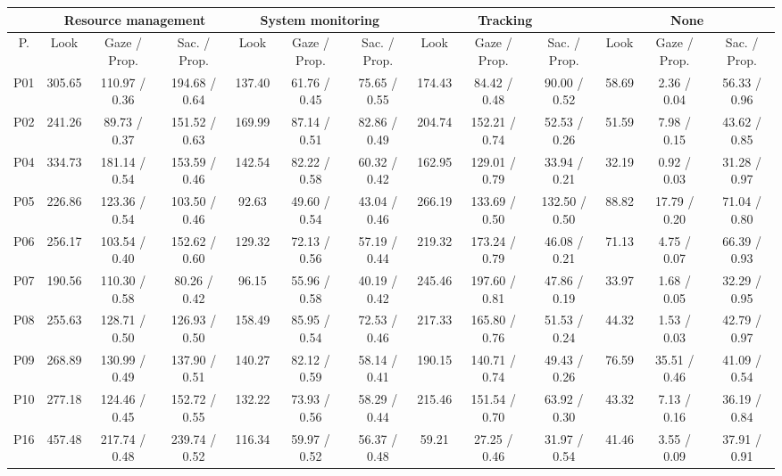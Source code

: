 \begin{tabular}{|c|c|c|c|c|c|c|c|c|c|c|c|c|}
\hline
 & \multicolumn{3}{|c}{Resource management} & \multicolumn{3}{|c}{System monitoring} & \multicolumn{3}{|c}{Tracking} & \multicolumn{3}{|c}{None} \\ \hline 
P. & Look & Gaze / Prop. & Sac. / Prop. & Look & Gaze / Prop. & Sac. / Prop. & Look & Gaze / Prop. & Sac. / Prop. & Look & Gaze  / Prop. & Sac. / Prop.\\ \hline 
 P01& 305.65 & 110.97 /   0.36 & 194.68 /   0.64& 137.40 &  61.76 /   0.45 &  75.65 /   0.55& 174.43 &  84.42 /   0.48 &  90.00 /   0.52&  58.69 &   2.36 /   0.04 &  56.33 /   0.96\\ \hline 
P02& 241.26 &  89.73 /   0.37 & 151.52 /   0.63& 169.99 &  87.14 /   0.51 &  82.86 /   0.49& 204.74 & 152.21 /   0.74 &  52.53 /   0.26&  51.59 &   7.98 /   0.15 &  43.62 /   0.85\\ \hline 
P04& 334.73 & 181.14 /   0.54 & 153.59 /   0.46& 142.54 &  82.22 /   0.58 &  60.32 /   0.42& 162.95 & 129.01 /   0.79 &  33.94 /   0.21&  32.19 &   0.92 /   0.03 &  31.28 /   0.97\\ \hline 
P05& 226.86 & 123.36 /   0.54 & 103.50 /   0.46&  92.63 &  49.60 /   0.54 &  43.04 /   0.46& 266.19 & 133.69 /   0.50 & 132.50 /   0.50&  88.82 &  17.79 /   0.20 &  71.04 /   0.80\\ \hline 
P06& 256.17 & 103.54 /   0.40 & 152.62 /   0.60& 129.32 &  72.13 /   0.56 &  57.19 /   0.44& 219.32 & 173.24 /   0.79 &  46.08 /   0.21&  71.13 &   4.75 /   0.07 &  66.39 /   0.93\\ \hline 
P07& 190.56 & 110.30 /   0.58 &  80.26 /   0.42&  96.15 &  55.96 /   0.58 &  40.19 /   0.42& 245.46 & 197.60 /   0.81 &  47.86 /   0.19&  33.97 &   1.68 /   0.05 &  32.29 /   0.95\\ \hline 
P08& 255.63 & 128.71 /   0.50 & 126.93 /   0.50& 158.49 &  85.95 /   0.54 &  72.53 /   0.46& 217.33 & 165.80 /   0.76 &  51.53 /   0.24&  44.32 &   1.53 /   0.03 &  42.79 /   0.97\\ \hline 
P09& 268.89 & 130.99 /   0.49 & 137.90 /   0.51& 140.27 &  82.12 /   0.59 &  58.14 /   0.41& 190.15 & 140.71 /   0.74 &  49.43 /   0.26&  76.59 &  35.51 /   0.46 &  41.09 /   0.54\\ \hline 
P10& 277.18 & 124.46 /   0.45 & 152.72 /   0.55& 132.22 &  73.93 /   0.56 &  58.29 /   0.44& 215.46 & 151.54 /   0.70 &  63.92 /   0.30&  43.32 &   7.13 /   0.16 &  36.19 /   0.84\\ \hline 
P16& 457.48 & 217.74 /   0.48 & 239.74 /   0.52& 116.34 &  59.97 /   0.52 &  56.37 /   0.48&  59.21 &  27.25 /   0.46 &  31.97 /   0.54&  41.46 &   3.55 /   0.09 &  37.91 /   0.91\\ \hline 

\end{tabular}
